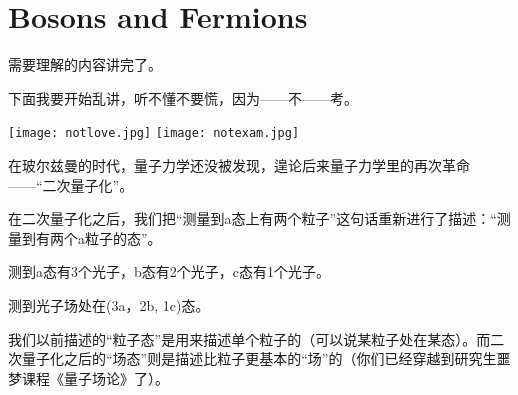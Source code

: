 \documentclass[CJK]{beamer}
\begin{document}
\section{Bosons and Fermions}

\begin{frame}
\bch
需要理解的内容讲完了。

\skipline

下面我要开始乱讲，听不懂不要慌，因为——不——考。

\skiplines

\texttt{[image: notlove.jpg]} \hspace{0.25in} \texttt{[image: notexam.jpg]}

\ech
\end{frame}

\begin{frame}
\bch
在玻尔兹曼的时代，量子力学还没被发现，遑论后来量子力学里的再次革命——“二次量子化”。

\skiplines

在二次量子化之后，我们把“测量到a态上有两个粒子”这句话重新进行了描述：“测量到有两个a粒子的态”。

\skipline

\ech
\end{frame}


\begin{frame}
\bch
{}

测到a态有3个光子，b态有2个光子，c态有1个光子。
\ech
\end{frame}


\begin{frame}
\bch
{}
\emini
{}
测到光子场处在(3a，2b, 1c)态。

\skiplines

我们以前描述的“粒子态”是用来描述单个粒子的（可以说某粒子处在某态）。而二次量子化之后的“场态”则是描述比粒子更基本的“场”的（\bye 你们已经穿越到研究生噩梦课程《量子场论》了）。

\emini

\ech
\end{frame}
\end{document}
